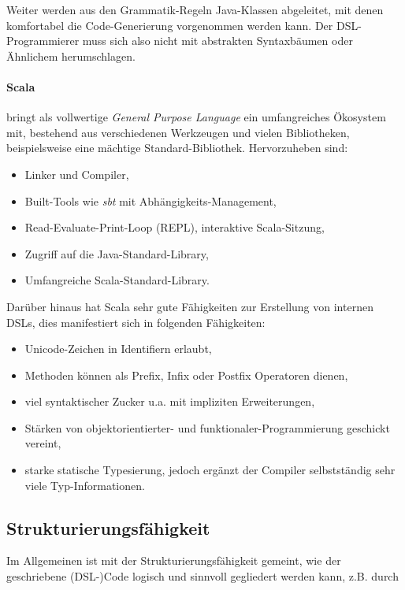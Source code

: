 Weiter werden aus den Grammatik-Regeln Java-Klassen abgeleitet, mit denen
komfortabel die Code-Generierung vorgenommen werden kann. Der DSL-Programmierer
muss sich also nicht mit abstrakten Syntaxbäumen oder Ähnlichem herumschlagen.

\paragraph{Scala} bringt als vollwertige \emph{General Purpose Language}
ein umfangreiches Ökosystem mit, bestehend aus verschiedenen Werkzeugen
und vielen Bibliotheken, beispielsweise eine mächtige Standard-Bibliothek.
Hervorzuheben sind:

\begin{itemize}
  \item Linker und Compiler,
  \item Built-Tools wie \emph{sbt} mit Abhängigkeits-Management,
  \item Read-Evaluate-Print-Loop (REPL), interaktive Scala-Sitzung,
  \item Zugriff auf die Java-Standard-Library,
  \item Umfangreiche Scala-Standard-Library.
\end{itemize}

Darüber hinaus hat Scala sehr gute Fähigkeiten zur Erstellung von internen
DSLs, dies manifestiert sich in folgenden Fähigkeiten:

\begin{itemize}
  \item Unicode-Zeichen in Identifiern erlaubt,
  \item Methoden können als Prefix, Infix oder Postfix Operatoren dienen,
  \item viel syntaktischer Zucker u.a. mit impliziten Erweiterungen,
  \item Stärken von objektorientierter- und funktionaler-Programmierung
        geschickt vereint,
  \item starke statische Typesierung, jedoch ergänzt der Compiler selbstständig
        sehr viele Typ-Informationen.
\end{itemize}


\subsection{Strukturierungsfähigkeit}\label{sec-strukturierungsfaehigkeit}

Im Allgemeinen ist mit der Strukturierungsfähigkeit gemeint, wie der
geschriebene (DSL-)Code logisch und sinnvoll gegliedert werden kann,
z.B. durch


